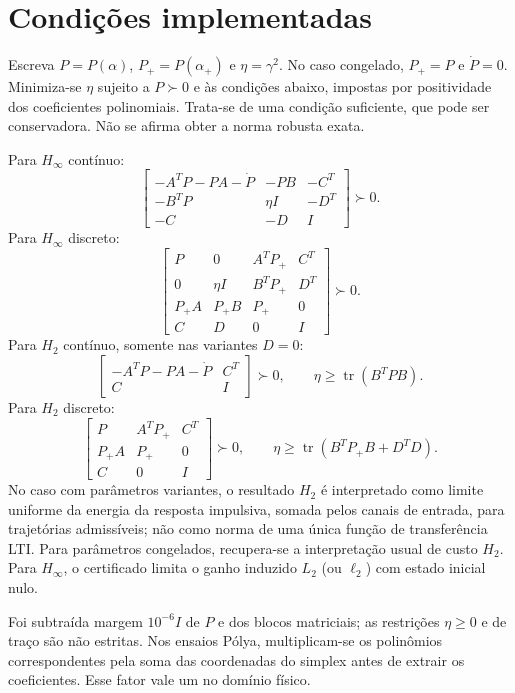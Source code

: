 \section{Condições implementadas}
Escreva $P=P(\alpha)$, $P_+=P(\alpha_+)$ e $\eta=\gamma^2$.
No caso congelado, $P_+=P$ e $\dot P=0$.
Minimiza-se $\eta$ sujeito a $P\succ0$ e às condições abaixo, impostas por
positividade dos coeficientes polinomiais. Trata-se de uma condição suficiente,
que pode ser conservadora. Não se afirma obter a norma robusta exata.

Para $H_\infty$ contínuo:
\[
\begin{bmatrix}
-A^TP-PA-\dot P&-PB&-C^T\\
-B^TP&\eta I&-D^T\\-C&-D&I
\end{bmatrix}\succ0.
\]
Para $H_\infty$ discreto:
\[
\begin{bmatrix}
P&0&A^TP_+&C^T\\0&\eta I&B^TP_+&D^T\\
P_+A&P_+B&P_+&0\\C&D&0&I
\end{bmatrix}\succ0.
\]
Para $H_2$ contínuo, somente nas variantes $D=0$:
\[
\begin{bmatrix}-A^TP-PA-\dot P&C^T\\C&I\end{bmatrix}\succ0,
\qquad \eta\geq\operatorname{tr}(B^TPB).
\]
Para $H_2$ discreto:
\[
\begin{bmatrix}P&A^TP_+&C^T\\P_+A&P_+&0\\C&0&I\end{bmatrix}\succ0,
\qquad\eta\geq\operatorname{tr}(B^TP_+B+D^TD).
\]
No caso com parâmetros variantes, o resultado $H_2$ é interpretado como
limite uniforme da energia da resposta impulsiva, somada pelos canais de
entrada, para trajetórias admissíveis; não como norma de uma única função de
transferência LTI. Para parâmetros congelados, recupera-se a interpretação
usual de custo $H_2$. Para $H_\infty$, o certificado limita o ganho induzido
$L_2$ (ou $\ell_2$) com estado inicial nulo.

Foi subtraída margem $10^{-6}I$ de $P$ e dos blocos matriciais; as restrições
$\eta\geq0$ e de traço são não estritas. Nos ensaios Pólya, multiplicam-se
os polinômios correspondentes pela soma das coordenadas do simplex antes de
extrair os coeficientes. Esse fator vale um no domínio físico.
